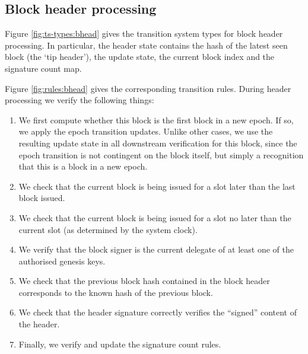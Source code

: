 \documentclass[11pt,a4paper]{article}
\begin{document}
\subsection{Block header processing}

Figure \ref{fig:ts-types:bhead} gives the transition system types for block
header processing. In particular, the header state contains the hash of the
latest seen block (the `tip header'), the update state, the current block index
and the signature count map.

Figure \ref{fig:rules:bhead} gives the corresponding transition rules. During
header processing we verify the following things:

\begin{enumerate}
  \item We first compute whether this block is the first block in a new epoch.
    If so, we apply the epoch transition updates. Unlike other cases, we use the
    resulting update state in all downstream verification for this block, since
    the epoch transition is not contingent on the block itself, but simply a
    recognition that this is a block in a new epoch.
  \item We check that the current block is being issued for a slot later than
    the last block issued.
  \item We check that the current block is being issued for a slot no later than
    the current slot (as determined by the system clock).
  \item We verify that the block signer is the current delegate of at least one
    of the authorised genesis keys.
  \item We check that the previous block hash contained in the block header
    corresponds to the known hash of the previous block.
  \item We check that the header signature correctly verifies the ``signed''
    content of the header.
  \item Finally, we verify and update the signature count rules.
\end{enumerate}
\end{document}
